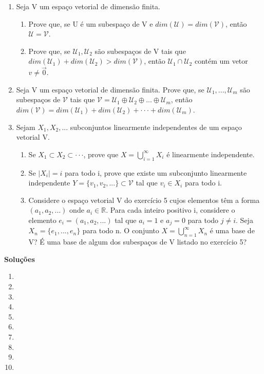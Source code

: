 \documentclass[12pt]{article}
\begin{document}
\begin{enumerate}
    \item Seja V um espaço vetorial de dimensão finita.
    \begin{enumerate}
        \item Prove que, se U é um subespaço de V e $dim(\mathcal{U}) = dim(\mathcal{V})$, então $\mathcal{U}=\mathcal{V}$.
        \item Prove que, se $\mathcal{U}_{1}, \mathcal{U}_{2}$ são subespaços de V tais que $dim(\mathcal{U}_{1}) + dim(\mathcal{U}_{2}) > dim(\mathcal{V})$, então $\mathcal{U}_{1} \cap \mathcal{U}_{2}$ contém um vetor $v \ne \vec{0}$.
    \end{enumerate}

    \item Seja V um espaço vetorial de dimensão finita. Prove que, se $\mathcal{U}_{1},...,\mathcal{U}_{m}$ são subespaços de $\mathcal{V}$ tais que $\mathcal{V} = \mathcal{U}_{1} \oplus \mathcal{U}_{2} \oplus ... \oplus \mathcal{U}_{m}$, então $dim(\mathcal{V}) = dim(\mathcal{U}_{1}) + dim(\mathcal{U}_{2}) + \cdot\cdot\cdot + dim(\mathcal{U}_{m})$.

    \item Sejam $X_{1}, X_{2}, ...$ subconjuntos linearmente independentes de um espaço vetorial V.
    \begin{enumerate}
        \item Se $X_{1} \subset X_{2} \subset \cdot\cdot\cdot$, prove que $X=\bigcup_{i=1}^{\infty}X_{i}$ é linearmente independente.
        \item Se $|X_{i}|=i$ para todo i, prove que existe um subconjunto linearmente independente $Y=\{v_{1},v_{2},...\} \subset \mathcal{V}$ tal que $v_{i} \in X_{i}$ para todo i.
        \item Considere o espaço vetorial V do exercício 5 cujos elementos têm a forma $(a_{1},a_{2},...)$ onde $a_{i} \in \mathbb{R}$. Para cada inteiro positivo i, considere o elemento $e_{i}=(a_{1},a_{2},...)$ tal que $a_{i}=1$ e $a_{j}=0$ para todo $j \ne i$. Seja $X_{n}=\{e_{1},...,e_{n}\}$ para todo n. O conjunto $X=\bigcup_{n=1}^{\infty}X_{n}$ é uma base de V? É uma base de algum dos subespaços de V listado no exercício 5?
    \end{enumerate}

\end{enumerate}

\begin{center}
    \textbf{Soluções}
\end{center}

\begin{enumerate}
    \item[\textbf{E1}]
    \item[\textbf{E2}]
    \item[\textbf{E3}]
    \item[\textbf{E4}]
    \item[\textbf{E5}]
    \item[\textbf{E6}]
    \item[\textbf{E7}]
    \item[\textbf{E8}]
    \item[\textbf{E9}]
    \item[\textbf{E10}]
\end{enumerate}
\end{document}
